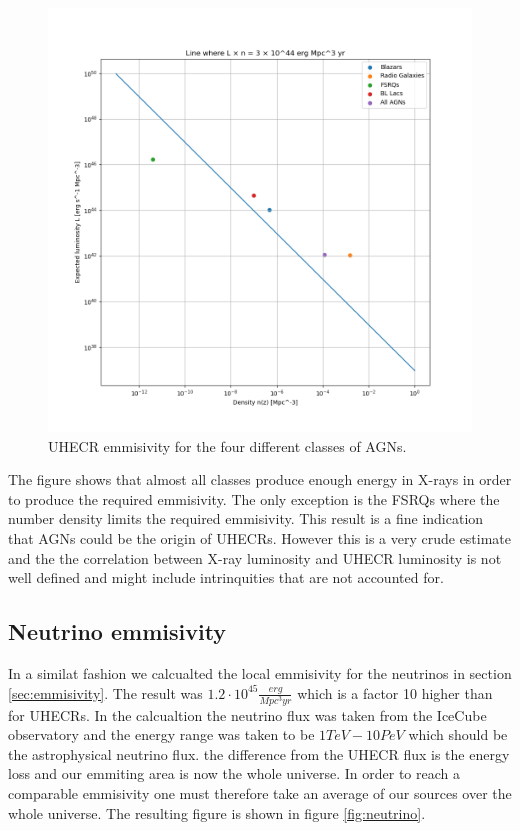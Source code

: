 \documentclass{article}
\begin{document}
\begin{figure}[H]
    \centering
    \includegraphics[width = \textwidth]{L_n_line.png}
    \caption{UHECR emmisivity for the four different classes of AGNs.}
    \label{fig:UHECR}
\end{figure}

The figure shows that almost all classes produce enough energy in X-rays in order to produce the required emmisivity. The only exception is the FSRQs where the number
density limits the required emmisivity. This result is a fine indication that AGNs could be the origin of UHECRs. However this is a very crude estimate and the
the correlation between X-ray luminosity and UHECR luminosity is not well defined and might include intrinquities that are not accounted for.

\subsection{Neutrino emmisivity}
In a similat fashion we calcualted the local emmisivity for the neutrinos in section \ref{sec:emmisivity}. The result was $1.2 \cdot 10^{45}\frac{erg}{Mpc^3yr}$ which is a factor 10 higher than for UHECRs.
In the calcualtion the neutrino flux was taken from the IceCube observatory \cite{Abbasi_2022} and the energy range was taken to be $1TeV - 10PeV$ which should be the astrophysical neutrino flux.
the difference from the UHECR flux is the energy loss and our emmiting area is now the whole universe. In order to reach a comparable emmisivity one must therefore take an average of our sources over the whole universe.
The  resulting figure is shown in figure \ref{fig:neutrino}.
\end{document}
